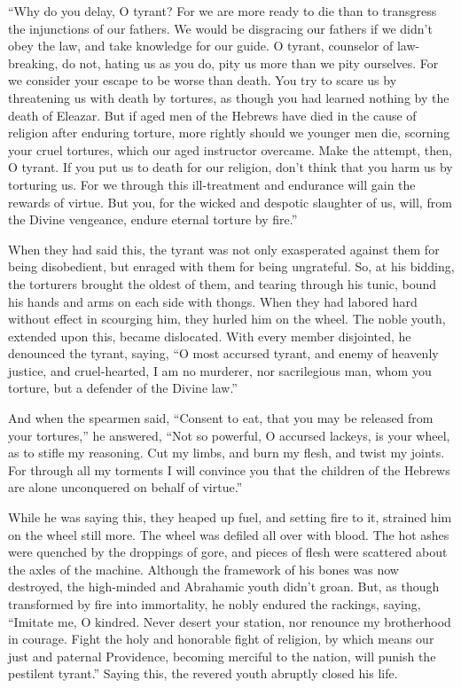 ``Why do you delay, O tyrant? For we are more ready to
die than to transgress the injunctions of our fathers.  We
would be disgracing our fathers if we didn't obey the law, and take
knowledge for our guide.  O tyrant, counselor of
law-breaking, do not, hating us as you do, pity us more than we pity
ourselves.  For we consider your escape to be worse than
death.  You try to scare us by threatening us with death
by tortures, as though you had learned nothing by the death of Eleazar.
 But if aged men of the Hebrews have died in the cause of
religion after enduring torture, more rightly should we younger men die,
scorning your cruel tortures, which our aged instructor overcame.
 Make the attempt, then, O tyrant. If you put us to death
for our religion, don't think that you harm us by torturing us.
 For we through this ill-treatment and endurance will gain
the rewards of virtue.  But you, for the wicked and
despotic slaughter of us, will, from the Divine vengeance, endure
eternal torture by fire.''

 When they had said this, the tyrant was not only
exasperated against them for being disobedient, but enraged with them
for being ungrateful.  So, at his bidding, the torturers
brought the oldest of them, and tearing through his tunic, bound his
hands and arms on each side with thongs.  When they had
labored hard without effect in scourging him, they hurled him on the
wheel.  The noble youth, extended upon this, became
dislocated.  With every member disjointed, he denounced
the tyrant, saying,  ``O most accursed tyrant, and enemy
of heavenly justice, and cruel-hearted, I am no murderer, nor
sacrilegious man, whom you torture, but a defender of the Divine law.''

 And when the spearmen said, ``Consent to eat, that you
may be released from your tortures,''  he answered, ``Not
so powerful, O accursed lackeys, is your wheel, as to stifle my
reasoning. Cut my limbs, and burn my flesh, and twist my joints.
 For through all my torments I will convince you that the
children of the Hebrews are alone unconquered on behalf of virtue.''

 While he was saying this, they heaped up fuel, and
setting fire to it, strained him on the wheel still more.
 The wheel was defiled all over with blood. The hot ashes
were quenched by the droppings of gore, and pieces of flesh were
scattered about the axles of the machine.  Although the
framework of his bones was now destroyed, the high-minded and Abrahamic
youth didn't groan.  But, as though transformed by fire
into immortality, he nobly endured the rackings, saying, 
``Imitate me, O kindred. Never desert your station, nor renounce my
brotherhood in courage. Fight the holy and honorable fight of religion,
 by which means our just and paternal Providence,
becoming merciful to the nation, will punish the pestilent tyrant.''
 Saying this, the revered youth abruptly closed his life.

